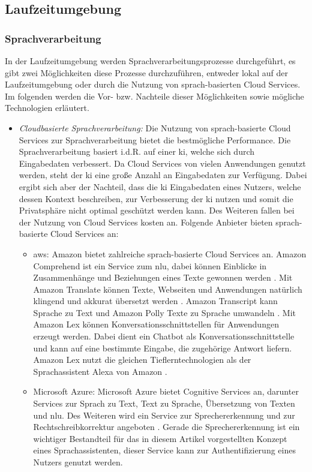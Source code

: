 \subsection{Laufzeitumgebung}
\subsubsection{Sprachverarbeitung}
In der Laufzeitumgebung werden Sprachverarbeitungsprozesse durchgeführt, es gibt zwei Möglichkeiten diese Prozesse durchzuführen, entweder lokal auf der Laufzeitumgebung oder durch die Nutzung von sprach-basierten Cloud Services. Im folgenden werden die Vor- bzw. Nachteile dieser Möglichkeiten sowie mögliche Technologien erläutert.
\begin{itemize}
	\item \textsl{Cloudbasierte Sprachverarbeitung:} Die Nutzung von sprach-basierte Cloud Services zur Sprachverarbeitung bietet die bestmögliche Performance. Die Sprachverarbeitung basiert i.d.R. auf einer \ac{ki}, welche sich durch Eingabedaten verbessert. Da Cloud Services von vielen Anwendungen genutzt werden, steht der \ac{ki} eine große Anzahl an Eingabedaten zur Verfügung. Dabei ergibt sich aber der Nachteil, dass die \ac{ki} Eingabedaten eines Nutzers, welche dessen Kontext beschreiben, zur Verbesserung der \ac{ki} nutzen und somit die Privatsphäre nicht optimal geschützt werden kann. Des Weiteren fallen bei der Nutzung von Cloud Services kosten an. Folgende Anbieter bieten sprach-basierte Cloud Services an:
	\begin{itemize}
		\item \ac{aws}: Amazon bietet zahlreiche sprach-basierte Cloud Services an. Amazon Comprehend ist ein Service zum \ac{nlu}, dabei können Einblicke in Zusammenhänge und Beziehungen eines Texte gewonnen werden \cite{AmazonComprehed}. Mit Amazon Translate können Texte, Webseiten und Anwendungen natürlich klingend und akkurat übersetzt werden \cite{AmazonTranslate}. Amazon Transcript kann Sprache zu Text und Amazon Polly Texte zu Sprache umwandeln \cite{AmazonTranscript} \cite{AmazonPolly}. Mit Amazon Lex können Konversationsschnittstellen für Anwendungen erzeugt werden. Dabei dient ein Chatbot als Konversationsschnittstelle und kann auf eine bestimmte Eingabe, die zugehörige Antwort liefern. Amazon Lex nutzt die gleichen Tieflerntechnologien als der Sprachassistent Alexa von Amazon \cite{AmazonLex}.
		\item Microsoft Azure: Microsoft Azure bietet Cognitive Services an, darunter Services zur Sprach zu Text, Text zu Sprache, Übersetzung von Texten und \ac{nlu}. Des Weiteren wird ein Service zur Sprechererkennung und zur Rechtschreibkorrektur angeboten \cite{MicrosoftAzureCognitiveServices}. Gerade die Sprechererkennung ist ein wichtiger Bestandteil für das in diesem Artikel vorgestellten Konzept eines Sprachassistenten, dieser Service kann zur Authentifizierung eines Nutzers genutzt werden. 

\end{itemize}
\end{itemize}
